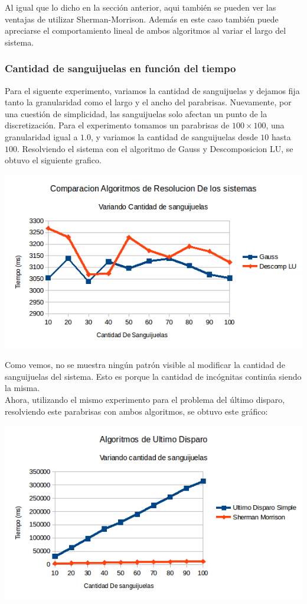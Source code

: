 Al igual que lo dicho en la sección anterior, aqui también se pueden ver las ventajas de utilizar Sherman-Morrison. Además en este caso también puede apreciarse el comportamiento lineal de ambos algoritmos al variar el largo del sistema.

\subsubsection{Cantidad de sanguijuelas en función del tiempo}
Para el siguente experimento, variamos la cantidad de sanguijuelas y dejamos fija tanto la granularidad como el largo y el ancho del parabrisas. Nuevamente, por una cuestión de simplicidad, las sanguijuelas solo afectan un punto de la discretización. Para el experimento tomamos un parabrisas de $100 \times 100$, una granularidad igual a $1.0$, y variamos la cantidad de sanguijuelas desde $10$ hasta $100$. Resolviendo el sistema con el algoritmo de Gauss y Descomposicion LU, se obtuvo el siguiente grafico.

\begin{center}
 \includegraphics[width=400pt]{imagenes/testeo/sangGauss.png}
\end{center}

Como vemos, no se muestra ningún patrón visible al modificar la cantidad de sanguijuelas del sistema. Esto es porque la cantidad de incógnitas continúa siendo la misma.
\\
Ahora, utilizando el mismo experimento para el problema del último disparo, resolviendo este parabrisas con ambos algoritmos, se obtuvo este gráfico:

\begin{center}
 \includegraphics[width=400pt]{imagenes/testeo/sangSalv.png}
\end{center}

